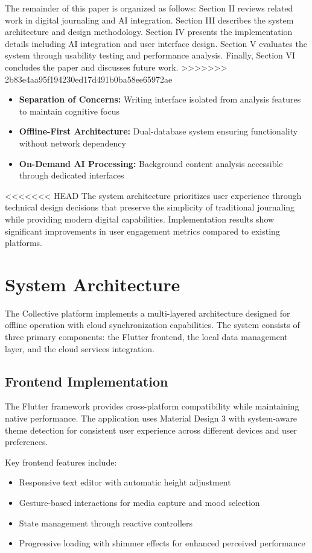 \documentclass[conference]{IEEEtran}
\begin{document}
{\begin{IEEEkeywords}
The remainder of this paper is organized as follows: Section II reviews related work in digital journaling and AI integration. Section III describes the system architecture and design methodology. Section IV presents the implementation details including AI integration and user interface design. Section V evaluates the system through usability testing and performance analysis. Finally, Section VI concludes the paper and discusses future work.
>>>>>>> 2b83e4aa95f194230ed17d491b0ba58ee65972ae

\begin{itemize}
\item \textbf{Separation of Concerns:} Writing interface isolated from analysis features to maintain cognitive focus
\item \textbf{Offline-First Architecture:} Dual-database system ensuring functionality without network dependency
\item \textbf{On-Demand AI Processing:} Background content analysis accessible through dedicated interfaces
\end{itemize}

<<<<<<< HEAD
The system architecture prioritizes user experience through technical design decisions that preserve the simplicity of traditional journaling while providing modern digital capabilities. Implementation results show significant improvements in user engagement metrics compared to existing platforms.

\section{System Architecture}

The Collective platform implements a multi-layered architecture designed for offline operation with cloud synchronization capabilities. The system consists of three primary components: the Flutter frontend, the local data management layer, and the cloud services integration.

\subsection{Frontend Implementation}

The Flutter framework provides cross-platform compatibility while maintaining native performance. The application uses Material Design 3 with system-aware theme detection for consistent user experience across different devices and user preferences.

Key frontend features include:
\begin{itemize}
\item Responsive text editor with automatic height adjustment
\item Gesture-based interactions for media capture and mood selection
\item State management through reactive controllers
\item Progressive loading with shimmer effects for enhanced perceived performance
\end{itemize}


\end{IEEEkeywords}}
\end{document}

